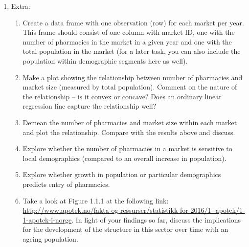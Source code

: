 \documentclass[12pt,a4paper]{article}
\begin{document}
\begin{enumerate}
\item Extra: 
\begin{enumerate}
\item Create a data frame with one observation (row) for each market per year. This frame should consist of one column with market ID, one with the number of pharmacies in the market in a given year and one with the total population in the market (for a later task, you can also include the population within demographic segments here as well).
\item Make a plot showing the relationship between number of pharmacies and market size (measured by total population). Comment on the nature of the relationship -- is it convex or concave? Does an ordinary linear regression line capture the relationship well?
\item Demean the number of pharmacies and market size within each market and plot the relationship. Compare with the results above and discuss.
\item Explore whether the number of pharmacies in a market is sensitive to local demographics (compared to an overall increase in population).
\item Explore whether growth in population or particular demographics predicts entry of pharmacies.
\item Take a look at Figure 1.1.1 at the following link: \url{http://www.apotek.no/fakta-og-ressurser/statistikk-for-2016/1--apotek/1-1-apotek-i-norge}. In light of your findings so far, discuss the implications for the development of the structure in this sector over time with an ageing population.
\end{enumerate}
\end{enumerate}
\end{document}
